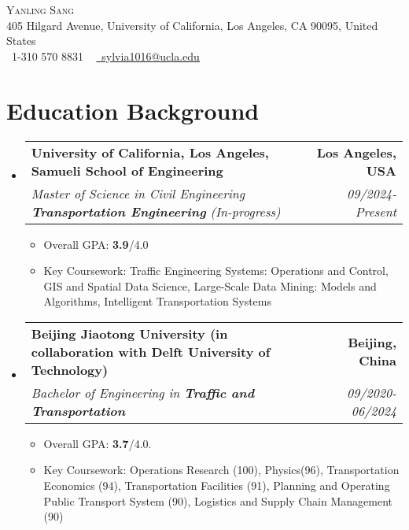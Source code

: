 \documentclass[letterpaper,11pt]{article}
\makeatletter
\newcommand{\resumeItem}[1]{
  \item\small{
    {#1 \vspace{-2pt}}
  }
}
\newcommand{\resumeSubheading}[4]{
  \vspace{-2pt}\item
    \begin{tabular*}{1.0\textwidth}[t]{l@{\extracolsep{\fill}}r}
      \textbf{#1} & \textbf{\small #2} \\
      \textit{\small#3} & \textit{\small #4} \\
    \end{tabular*}\vspace{-7pt}
}
\newcommand{\resumeSubHeadingListStart}{\begin{itemize}[leftmargin=0.0in, label={}]}
\newcommand{\resumeSubHeadingListEnd}{\end{itemize}}
\newcommand{\resumeItemListStart}{\begin{itemize}}
\newcommand{\resumeItemListEnd}{\end{itemize}\vspace{-5pt}}
\makeatother
\begin{document}

\begin{center}
    {\Huge \scshape Yanling Sang} \\ \vspace{1pt}
    405 Hilgard Avenue, University of California, Los Angeles, CA 90095, United States\\ \vspace{1pt}
    \small \raisebox{-0.1\height}\faPhone\ 1-310 570 8831 ~ \href{mailto:sylvia1016@ucla.edu}{\raisebox{-0.2\height}\faEnvelope\  \underline{sylvia1016@ucla.edu}} ~ 
    \vspace{-8pt}
\end{center}

\section{Education Background}
  \resumeSubHeadingListStart
  \resumeSubheading
    {University of California, Los Angeles, Samueli School of Engineering}{Los Angeles, USA}
    {Master of Science in Civil Engineering \textbf{Transportation Engineering} (In-progress)}{\textit{09/2024-Present}}
    \resumeItemListStart
        \resumeItem{Overall GPA: \textbf{3.9}/4.0}
        \resumeItem{Key Coursework: Traffic Engineering Systems: Operations and Control, GIS and Spatial Data Science, Large-Scale Data Mining: Models and Algorithms, Intelligent Transportation Systems}
    \resumeItemListEnd
    
    \resumeSubheading
      {Beijing Jiaotong University (in collaboration with Delft University of Technology) }{Beijing, China}
      {Bachelor of Engineering in \textbf{Traffic and Transportation}}{\textit{09/2020-06/2024}}
      \resumeItemListStart
          \resumeItem{Overall GPA: \textbf{3.7}/4.0.}
          \resumeItem{Key Coursework: Operations Research (100), Physics(96), Transportation Economics (94), Transportation Facilities (91), Planning and Operating Public Transport System (90), Logistics and Supply Chain Management (90)}
      \resumeItemListEnd
  \resumeSubHeadingListEnd
  \vspace{-15pt}
\end{document}
